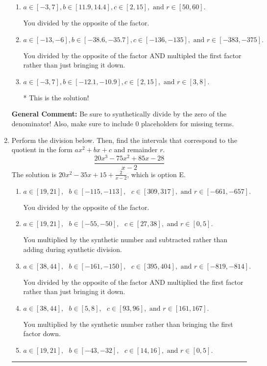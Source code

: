 \documentclass{extbook}[14pt]
\newcommand{\litem}[1]{\item #1

\rule{\textwidth}{0.4pt}}
\begin{document}
\begin{enumerate}
{\begin{enumerate}[label=\Alph*.]
 You multipled by the synthetic number and subtracted rather than adding during synthetic division.
\item \( a \in [-3, 7], b \in [11.9, 14.4], c \in [2, 15], \text{ and } r \in [50, 60]. \)

 You divided by the opposite of the factor.
\item \( a \in [-13, -6], b \in [-38.6, -35.7], c \in [-136, -135], \text{ and } r \in [-383, -375]. \)

 You divided by the opposite of the factor AND multipled the first factor rather than just bringing it down.
\item \( a \in [-3, 7], b \in [-12.1, -10.9], c \in [2, 15], \text{ and } r \in [3, 8]. \)

* This is the solution!
\end{enumerate}

\textbf{General Comment:} Be sure to synthetically divide by the zero of the denominator! Also, make sure to include 0 placeholders for missing terms.
}
\litem{
Perform the division below. Then, find the intervals that correspond to the quotient in the form $ax^2+bx+c$ and remainder $r$.
\[ \frac{20x^{3} -75 x^{2} +85 x -28}{x -2} \]The solution is \( 20x^{2} -35 x + 15 + \frac{2}{x -2} \), which is option E.\begin{enumerate}[label=\Alph*.]
\item \( a \in [19, 21], \text{   } b \in [-115, -113], \text{   } c \in [309, 317], \text{   and   } r \in [-661, -657]. \)

 You divided by the opposite of the factor.
\item \( a \in [19, 21], \text{   } b \in [-55, -50], \text{   } c \in [27, 38], \text{   and   } r \in [0, 5]. \)

 You multiplied by the synthetic number and subtracted rather than adding during synthetic division.
\item \( a \in [38, 44], \text{   } b \in [-161, -150], \text{   } c \in [395, 404], \text{   and   } r \in [-819, -814]. \)

 You divided by the opposite of the factor AND multiplied the first factor rather than just bringing it down.
\item \( a \in [38, 44], \text{   } b \in [5, 8], \text{   } c \in [93, 96], \text{   and   } r \in [161, 167]. \)

 You multiplied by the synthetic number rather than bringing the first factor down.
\item \( a \in [19, 21], \text{   } b \in [-43, -32], \text{   } c \in [14, 16], \text{   and   } r \in [0, 5]. \)


\end{enumerate}}
\end{enumerate}
\end{document}
